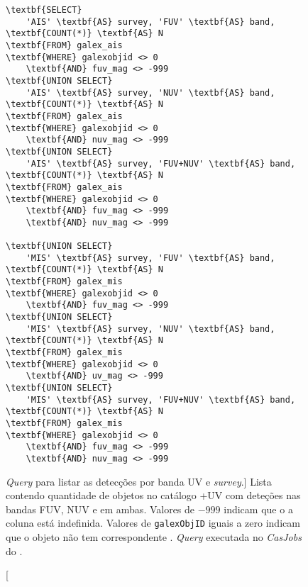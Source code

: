\begin{figure}
\begin{Verbatim}[commandchars=\\\{\}]
\textbf{SELECT}
	'AIS' \textbf{AS} survey, 'FUV' \textbf{AS} band, \textbf{COUNT(*)} \textbf{AS} N
\textbf{FROM} galex_ais
\textbf{WHERE} galexobjid <> 0
	\textbf{AND} fuv_mag <> -999
\textbf{UNION SELECT}
	'AIS' \textbf{AS} survey, 'NUV' \textbf{AS} band, \textbf{COUNT(*)} \textbf{AS} N
\textbf{FROM} galex_ais
\textbf{WHERE} galexobjid <> 0
	\textbf{AND} nuv_mag <> -999
\textbf{UNION SELECT}
	'AIS' \textbf{AS} survey, 'FUV+NUV' \textbf{AS} band, \textbf{COUNT(*)} \textbf{AS} N
\textbf{FROM} galex_ais
\textbf{WHERE} galexobjid <> 0
	\textbf{AND} fuv_mag <> -999
	\textbf{AND} nuv_mag <> -999
	
\textbf{UNION SELECT}
	'MIS' \textbf{AS} survey, 'FUV' \textbf{AS} band, \textbf{COUNT(*)} \textbf{AS} N
\textbf{FROM} galex_mis
\textbf{WHERE} galexobjid <> 0
	\textbf{AND} fuv_mag <> -999
\textbf{UNION SELECT}
	'MIS' \textbf{AS} survey, 'NUV' \textbf{AS} band, \textbf{COUNT(*)} \textbf{AS} N
\textbf{FROM} galex_mis
\textbf{WHERE} galexobjid <> 0
	\textbf{AND} uv_mag <> -999
\textbf{UNION SELECT}
	'MIS' \textbf{AS} survey, 'FUV+NUV' \textbf{AS} band, \textbf{COUNT(*)}	\textbf{AS} N
\textbf{FROM} galex_mis
\textbf{WHERE} galexobjid <> 0
	\textbf{AND} fuv_mag <> -999
	\textbf{AND} nuv_mag <> -999
\end{Verbatim}
	\caption
	[{\em Query} para listar as detecções por banda UV e {\em survey}.]
	{Lista contendo quantidade de objetos no catálogo \starlight+UV com deteções
	\galex nas bandas FUV, NUV e em ambas. Valores de $-999$ indicam que o a
	coluna está indefinida. Valores de \texttt{galexObjID} iguais a zero
	indicam que o objeto \starlight não tem correspondente {\galex}. {\em Query}
	executada no {\em CasJobs} do \starlight.}
	\label{fig:QueryListaPorBandaSurvey}
\end{figure}


